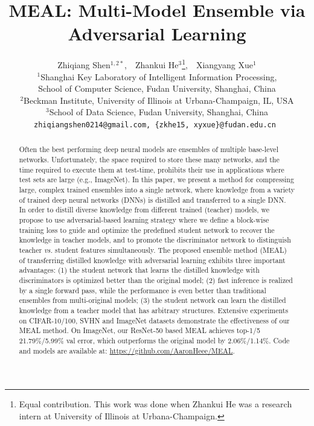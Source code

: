 \documentclass[letterpaper]{article} %
\begin{document}
%
\title{MEAL: Multi-Model Ensemble via Adversarial Learning}
\author{Zhiqiang Shen$^{1,2*}$,~~Zhankui He$^{3}$\thanks{Equal contribution. This work was done when Zhankui He was a research intern at University of Illinois at Urbana-Champaign.},~~Xiangyang Xue$^{1}$\\
	$^1$Shanghai Key Laboratory of Intelligent Information Processing, \\ School of Computer Science, Fudan University, Shanghai, China \\
	$^2$Beckman Institute, University of Illinois at Urbana-Champaign, IL, USA\\
	$^3$School of Data Science, Fudan University, Shanghai, China\\
	\tt\small zhiqiangshen0214@gmail.com,
	\tt\small \{zkhe15, xyxue\}@fudan.edu.cn
}
\maketitle
\begin{abstract}
Often the best performing deep neural models are ensembles of multiple base-level networks. Unfortunately, the space required to store these many networks, and the time required to execute them at test-time, prohibits their use in applications where test sets are large (e.g., ImageNet).
In this paper, we present a method for compressing large, complex trained ensembles into a single network,
where knowledge from a variety of trained deep neural networks (DNNs) is distilled and transferred to a single DNN. In order to distill diverse knowledge from different trained (teacher) models, we propose to use adversarial-based learning strategy where we define a block-wise training loss to guide and optimize the predefined student network to recover the knowledge in teacher models, and to promote the discriminator network to distinguish teacher {\em vs.} student features simultaneously. The proposed ensemble method (MEAL) of transferring distilled knowledge with adversarial learning exhibits three important advantages: (1) the student network that learns the distilled knowledge with discriminators is optimized better than the original model; (2) fast inference is realized by a single forward pass, while the performance is even better than traditional ensembles from multi-original models; (3) the student network can learn the distilled knowledge from a teacher model that has arbitrary structures. %
Extensive experiments on CIFAR-10/100, SVHN and ImageNet datasets demonstrate the effectiveness of our MEAL method. On ImageNet, our ResNet-50 based MEAL achieves top-1/5 21.79\%/5.99\% val error, which outperforms the original model by 2.06\%/1.14\%. Code and models are available at: \url{https://github.com/AaronHeee/MEAL}. 
\end{abstract}
\end{document}
